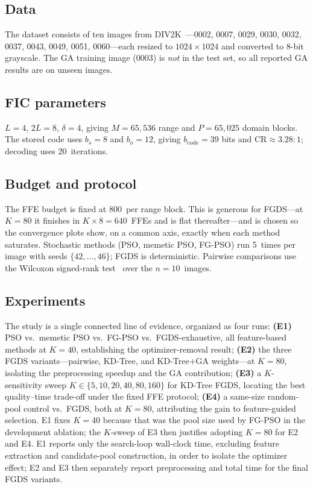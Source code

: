 \documentclass[conference, a4paper]{IEEEtran}
\begin{document}
\subsection{Data}
The dataset consists of ten images from DIV2K~\cite{div2k}---0002, 0007, 0029, 0030, 0032, 0037, 0043, 0049, 0051, 0060---each resized to \mbox{$1024\times1024$} and converted to 8-bit grayscale. The GA training image (0003) is \emph{not} in the test set, so all reported GA results are on unseen images.

\subsection{FIC parameters}
\mbox{$L\!=\!4$}, \mbox{$2L\!=\!8$}, \mbox{$\delta\!=\!4$}, giving \mbox{$M=65{,}536$} range and \mbox{$P\!=\!65{,}025$} domain blocks. The stored code uses \mbox{$b_s=8$} and \mbox{$b_o=12$}, giving \mbox{$b_{\text{code}}=39$} bits and \mbox{$\mathrm{CR}\approx3.28{:}1$}; decoding uses 20~iterations.

\subsection{Budget and protocol}
The FFE budget is fixed at 800~per range block. This is generous for FGDS---at \mbox{$K\!=\!80$} it finishes in \mbox{$K\!\times\!8\!=\!640$}~FFEs and is flat thereafter---and is chosen so the convergence plots show, on a common axis, exactly when each method saturates. Stochastic methods (PSO, memetic PSO, FG-PSO) run 5~times per image with seeds \mbox{$\{42,\dots,46\}$}; FGDS is deterministic. Pairwise comparisons use the Wilcoxon signed-rank test~\cite{wilcoxon1945individual} over the \mbox{$n\!=\!10$}~images.

\subsection{Experiments}
The study is a single connected line of evidence, organized as four runs:
\textbf{(E1)} PSO vs.\ memetic PSO vs.\ FG-PSO vs.\ FGDS-exhaustive, all feature-based methods at \mbox{$K\!=\!40$}, establishing the optimizer-removal result;
\textbf{(E2)} the three FGDS variants---pairwise, KD-Tree, and KD-Tree+GA weights---at \mbox{$K\!=\!80$}, isolating the preprocessing speedup and the GA contribution;
\textbf{(E3)} a \mbox{$K$}-sensitivity sweep \mbox{$K\in\{5,10,20,40,80,160\}$} for KD-Tree FGDS, locating the best quality--time trade-off under the fixed FFE protocol;
\textbf{(E4)} a same-size random-pool control vs.\ FGDS, both at \mbox{$K\!=\!80$}, attributing the gain to feature-guided selection.
E1 fixes \mbox{$K\!=\!40$} because that was the pool size used by FG-PSO in the development ablation; the \mbox{$K$}-sweep of E3 then justifies adopting \mbox{$K\!=\!80$} for E2 and E4. E1 reports only the search-loop wall-clock time, excluding feature extraction and candidate-pool construction, in order to isolate the optimizer effect; E2 and E3 then separately report preprocessing and total time for the final FGDS variants.
\end{document}
